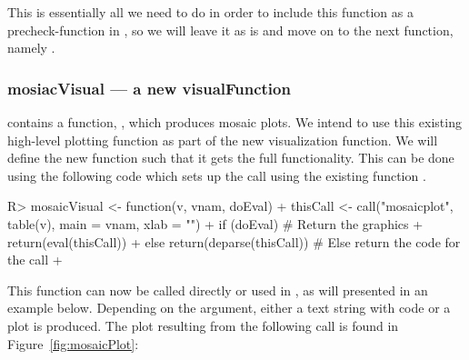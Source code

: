 \documentclass[article,shortnames]{jss}
\begin{document}
\begin{Schunk}
\end{Schunk}

This is essentially all we need to do in order to include this
function as a precheck-function in , so we will leave it as
is and move on to the next function, namely .

\subsubsection{mosiacVisual --- a new visualFunction}
 contains a function, , which produces
mosaic plots. We intend to use this existing high-level plotting
function as part of the new visualization function.  We will define
the new function such that it gets the full 
functionality. This can be done using the following code which sets up
the call using the existing function .

\begin{Schunk}
\begin{Sinput}
R> mosaicVisual <- function(v, vnam, doEval) {
+    thisCall <- call("mosaicplot", table(v), main = vnam, xlab = "")
+    if (doEval) {                     # Return the graphics
+      return(eval(thisCall))
+    } else return(deparse(thisCall))  # Else return the code for the call
+  }
\end{Sinput}
\end{Schunk}

This function can now be called directly or used in , as will
presented in an example below. Depending on the  argument, either a text string
with code or a plot is produced. The plot resulting from the following
call is found in Figure~\ref{fig:mosaicPlot}:

\begin{Schunk}
\end{Schunk}
\end{document}
